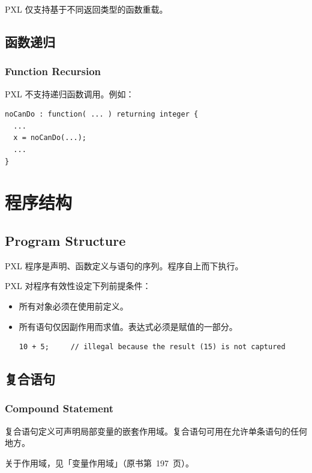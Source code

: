 \begin{noteBox}
PXL 仅支持基于不同返回类型的函数重载。
\end{noteBox}

\subsection{函数递归}
\subsubsection*{Function Recursion}

PXL 不支持递归函数调用。例如：
\begin{lstlisting}[style=pxl]
noCanDo : function( ... ) returning integer {
  ...
  x = noCanDo(...);
  ...
}
\end{lstlisting}

\section{程序结构}
\subsection*{Program Structure}

PXL 程序是声明、函数定义与语句的序列。程序自上而下执行。

PXL 对程序有效性设定下列前提条件：
\begin{itemize}
  \item 所有对象必须在使用前定义。
  \item 所有语句仅因副作用而求值。表达式必须是赋值的一部分。
\begin{lstlisting}[style=pxl]
10 + 5;     // illegal because the result (15) is not captured
\end{lstlisting}
\end{itemize}

\subsection{复合语句}
\subsubsection*{Compound Statement}

复合语句定义可声明局部变量的嵌套作用域。复合语句可用在允许单条语句的任何地方。

\begin{seeAlsoBox}
关于作用域，见「变量作用域」（原书第~197~页）。
\end{seeAlsoBox}

